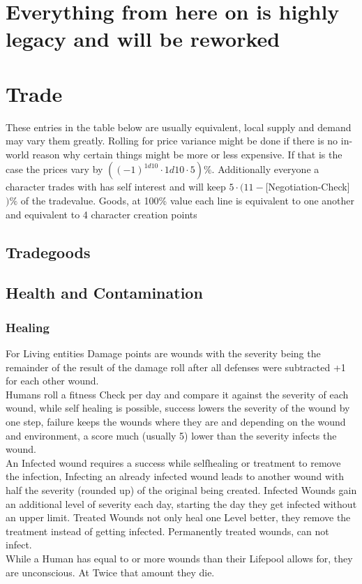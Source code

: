 


\chapter{Everything from here on is highly legacy and will be reworked}\label{ch:everything-from-here-on-is-highly-legacy-and-will-be-reworked}
\chapter{Trade}\label{ch:trade}
These entries in the table below are usually equivalent, local supply and demand may vary them greatly.
Rolling for price variance might be done if there is no in-world reason why certain things might be more or
less expensive.
If that is the case the prices vary by \(((-1)^{1d10}\cdot1d10\cdot5) \%\).
Additionally everyone a character trades with has self interest and will keep \(5\cdot(11-\)[Negotiation-Check]\()\%\) of
the tradevalue.\vspace{1.5cm}
Goods, at 100\% value each line is equivalent to one another and equivalent to 4 character creation points \par
\section{Tradegoods}\label{sec:tradegoods}


\section{Health and Contamination}\label{subsec:healthAndContamination}
\subsection{Healing}
For Living entities Damage points are wounds with the severity being the remainder of the result of the damage roll
after all defenses were subtracted +1 for each other wound.\\
Humans roll a fitness Check per day and compare it against the severity of each wound, while self healing is
possible, success lowers the severity of the wound by one step, failure keeps the wounds where they are and
depending on the wound and environment, a score much (usually 5) lower than the severity infects the wound.\\
An Infected wound requires a success while selfhealing or treatment to remove the infection, Infecting an already
infected wound leads to another wound with half the severity (rounded up) of the original being created.
Infected
Wounds gain an additional level of  severity each day, starting the day they get infected without an upper limit.
Treated Wounds not only heal one Level better, they remove the treatment instead of getting infected.
Permanently
treated wounds, can not infect. \\
While a Human has equal to or more wounds than their Lifepool allows for, they are unconscious.
At Twice that amount
they die.
